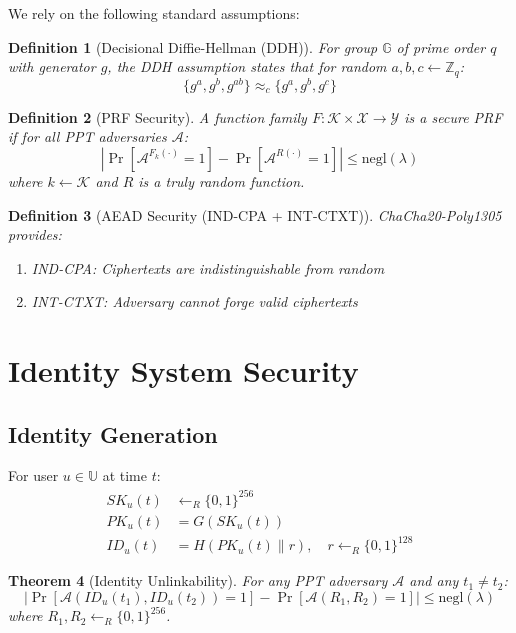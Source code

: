 \documentclass[11pt,a4paper]{article}
\newtheorem{theorem}{Theorem}[section]
\newtheorem{definition}[theorem]{Definition}
\begin{document}
We rely on the following standard assumptions:

\begin{definition}[Decisional Diffie-Hellman (DDH)]
For group $\mathbb{G}$ of prime order $q$ with generator $g$, the DDH assumption states that for random $a, b, c \leftarrow \mathbb{Z}_q$:
$$\{g^a, g^b, g^{ab}\} \approx_c \{g^a, g^b, g^c\}$$
\end{definition}

\begin{definition}[PRF Security]
A function family $F: \mathcal{K} \times \mathcal{X} \rightarrow \mathcal{Y}$ is a secure PRF if for all PPT adversaries $\mathcal{A}$:
$$\left| \Pr[\mathcal{A}^{F_k(\cdot)} = 1] - \Pr[\mathcal{A}^{R(\cdot)} = 1] \right| \leq \text{negl}(\lambda)$$
where $k \leftarrow \mathcal{K}$ and $R$ is a truly random function.
\end{definition}

\begin{definition}[AEAD Security (IND-CPA + INT-CTXT)]
ChaCha20-Poly1305 provides:
\begin{enumerate}
    \item IND-CPA: Ciphertexts are indistinguishable from random
    \item INT-CTXT: Adversary cannot forge valid ciphertexts
\end{enumerate}
\end{definition}

\section{Identity System Security}

\subsection{Identity Generation}

For user $u \in \mathbb{U}$ at time $t$:
\begin{align}
    SK_u(t) &\leftarrow_R \{0,1\}^{256} \\
    PK_u(t) &= G(SK_u(t)) \\
    ID_u(t) &= H(PK_u(t) \| r), \quad r \leftarrow_R \{0,1\}^{128}
\end{align}

\begin{theorem}[Identity Unlinkability]
For any PPT adversary $\mathcal{A}$ and any $t_1 \neq t_2$:
$$\left| \Pr[\mathcal{A}(ID_u(t_1), ID_u(t_2)) = 1] - \Pr[\mathcal{A}(R_1, R_2) = 1] \right| \leq \text{negl}(\lambda)$$
where $R_1, R_2 \leftarrow_R \{0,1\}^{256}$.
\end{theorem}
\end{document}
